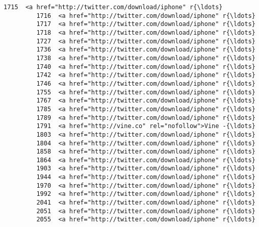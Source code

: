\documentclass[11pt]{article}
\begin{document}
\begin{Verbatim}[commandchars=\\\{\}]
         1715  <a href="http://twitter.com/download/iphone" r{\ldots}   
         1716  <a href="http://twitter.com/download/iphone" r{\ldots}   
         1717  <a href="http://twitter.com/download/iphone" r{\ldots}   
         1718  <a href="http://twitter.com/download/iphone" r{\ldots}   
         1727  <a href="http://twitter.com/download/iphone" r{\ldots}   
         1736  <a href="http://twitter.com/download/iphone" r{\ldots}   
         1738  <a href="http://twitter.com/download/iphone" r{\ldots}   
         1740  <a href="http://twitter.com/download/iphone" r{\ldots}   
         1742  <a href="http://twitter.com/download/iphone" r{\ldots}   
         1746  <a href="http://twitter.com/download/iphone" r{\ldots}   
         1755  <a href="http://twitter.com/download/iphone" r{\ldots}   
         1767  <a href="http://twitter.com/download/iphone" r{\ldots}   
         1785  <a href="http://twitter.com/download/iphone" r{\ldots}   
         1789  <a href="http://twitter.com/download/iphone" r{\ldots}   
         1791  <a href="http://vine.co" rel="nofollow">Vine -{\ldots}   
         1803  <a href="http://twitter.com/download/iphone" r{\ldots}   
         1804  <a href="http://twitter.com/download/iphone" r{\ldots}   
         1858  <a href="http://twitter.com/download/iphone" r{\ldots}   
         1864  <a href="http://twitter.com/download/iphone" r{\ldots}   
         1903  <a href="http://twitter.com/download/iphone" r{\ldots}   
         1944  <a href="http://twitter.com/download/iphone" r{\ldots}   
         1970  <a href="http://twitter.com/download/iphone" r{\ldots}   
         1992  <a href="http://twitter.com/download/iphone" r{\ldots}   
         2041  <a href="http://twitter.com/download/iphone" r{\ldots}   
         2051  <a href="http://twitter.com/download/iphone" r{\ldots}   
         2055  <a href="http://twitter.com/download/iphone" r{\ldots}   
         

\end{Verbatim}
\end{document}
